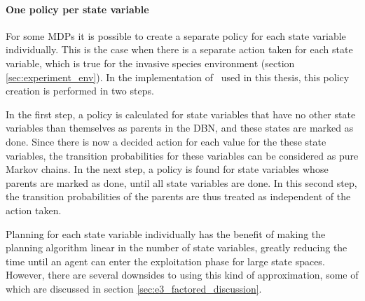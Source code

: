 \paragraph{One policy per state variable}
\label{sec:one_policy_per_state_variable}

For some MDPs it is possible to create a separate policy for each state
variable individually. This is the case when there is a separate action taken
for each state variable, which is true for the invasive species environment
(section \ref{sec:experiment_env}). In the implementation of \etre\ used in
this thesis, this policy creation is performed in two steps. 

In the first step, a policy is calculated for state variables that have no other state variables than themselves as parents in the DBN, and these states are marked as done. Since there is now a decided action for each value for the these state variables, the transition probabilities for these variables can be considered as pure Markov chains. In the next step, a policy is found for state variables whose parents are marked as done, until all state variables are done. In this second step, the transition probabilities of the parents are thus treated as independent of the action taken.

Planning for each state variable individually has the benefit of making the planning algorithm linear in the number of state variables, greatly reducing the time until an agent can enter the exploitation phase for large state spaces. However, there are several downsides to using this kind of approximation, some of which are discussed in section \ref{sec:e3_factored_discussion}.

